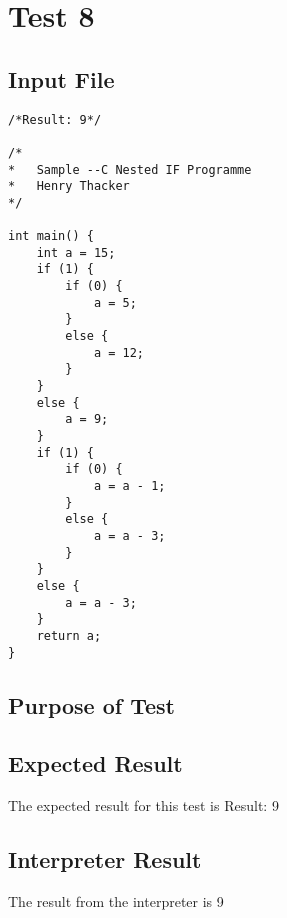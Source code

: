 \section{Test 8}
\subsection{Input File}
\begin{verbatim}
/*Result: 9*/

/*
*	Sample --C Nested IF Programme
*	Henry Thacker
*/

int main() {
	int a = 15;
	if (1) {
		if (0) {
			a = 5;
		}
		else {
			a = 12;
		}
	}
	else {
		a = 9;
	}
	if (1) {
		if (0) {
			a = a - 1;
		}
		else {
			a = a - 3;
		}
	}
	else {
		a = a - 3;
	}
	return a;
}\end{verbatim}\subsection{Purpose of Test}

\subsection{Expected Result}
The expected result for this test is Result: 9
\subsection{Interpreter Result}
The result from the interpreter is 9

